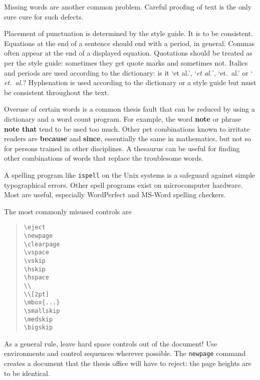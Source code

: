 Missing words are another common problem. Careful proofing of text is
the only sure cure for such defects.

Placement of punctuation is determined by the style guide. It is to be
consistent. Equations at the end of a sentence should end with a period,
in general. Commas often appear at the end of a displayed equation.
Quotations should be treated as per the style guide: sometimes they get
quote marks and sometimes not. Italics and periods are used according
to the dictionary: is it `et al.', `{\em et al.}', `et.\ al.' or `{\em
et.\ al.}? Hyphenation is used according to the dictionary or a style
guide but must be consistent throughout the text.

Overuse of certain words is a common thesis fault that can be reduced
by using a dictionary and a word count program. For example, the word
{\bf note} or phrase {\bf note that} tend to be used too much. Other pet
combinations known to irritate readers are {\bf because} and {\bf
since}, essentially the same in mathematics, but not so for persons
trained in other disciplines. A thesaurus can be useful for finding other
combinations of words that replace the troublesome words.

A spelling program like {\tt ispell} on the Unix systems is a safeguard
against simple typographical errors. Other spell programs exist on
microcomputer hardware. Most are useful, especially WordPerfect and
MS-Word spelling checkers.

The most commonly misused controls are

\begin{quote}
\verb"\eject" \\
\verb"\newpage" \\
\verb"\clearpage" \\
\verb"\vspace" \\
\verb"\vskip" \\
\verb"\hskip" \\
\verb"\hspace" \\
\verb"\\" \\
\verb"\\[2pt]" \\
\verb"\mbox{...}" \\
\verb"\smallskip" \\
\verb"\medskip" \\
\verb"\bigskip"
\end{quote}

As a general rule, leave hard space controls out of the document! Use
environments and control sequences wherever possible. The {\tt newpage}
command creates a document that the thesis office will have to reject:
the page heights are to be identical.

